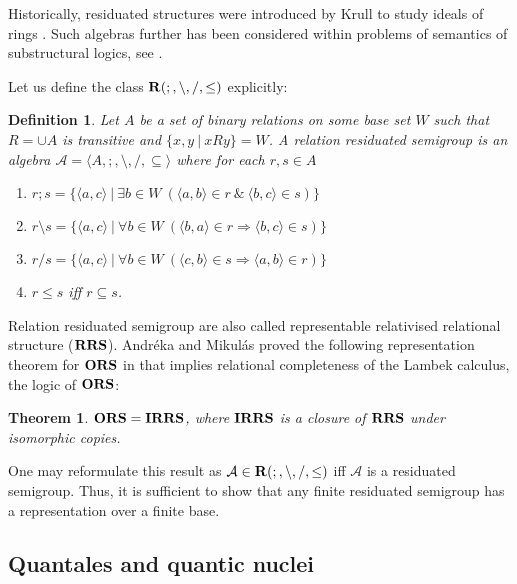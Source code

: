 \documentclass[a4paper]{article}
\theoremstyle{defin}
\newtheorem{defin}{Definition}
\theoremstyle{theorem}
\newtheorem{theorem}{Theorem}
\theoremstyle{prop}
\theoremstyle{lemma}
\theoremstyle{ex}
\theoremstyle{col}
\theoremstyle{claim}
\begin{document}
Historically, residuated structures were introduced by Krull to study ideals of rings \cite{krull1968idealtheorie}. Such algebras further has been considered within problems of semantics of substructural logics, see \cite{jipsen2002survey}.

Let us define the class ${\bf R}(;, \setminus, /, \leq)$ explicitly:

\begin{defin} \label{rrs}
  Let $A$ be a set of binary relations on some base set $W$ such that $R = \cup A$ is transitive and $\{ x, y \: | \: x R y \} = W$. A relation residuated semigroup is an algebra $\mathcal{A} = \langle A, ;, \setminus, /, \subseteq \rangle$ where for each $r, s \in A$
  \begin{enumerate}
    \item $r ; s = \{ \langle a, c \rangle \: | \: \exists b \in W \: (\langle a, b \rangle \in r \: \& \: \langle b, c \rangle \in s) \}$
    \item $r \setminus s = \{ \langle a, c \rangle \: | \: \forall b \in W \: (\langle b, a \rangle \in r \Rightarrow \langle b, c \rangle \in s)\}$
    \item $r / s = \{ \langle a, c \rangle \: | \: \forall b \in W \: (\langle c, b \rangle \in s \Rightarrow \langle a, b \rangle \in r)\}$
    \item $r \leq s$ iff $r \subseteq s$.
  \end{enumerate}
\end{defin}
Relation residuated semigroup are also called representable relativised relational structure (${\bf RRS}$).
Andr\'{e}ka and Mikul\'{a}s proved the following representation theorem for ${\bf ORS}$ in \cite{andreka1994lambek} that implies relational completeness of the Lambek calculus, the logic of ${\bf ORS}$:

\begin{theorem}\label{ors=irrs}
  ${\bf ORS} = {\bf IRRS}$, where ${\bf IRRS}$ is a closure of ${\bf RRS}$ under isomorphic copies.
\end{theorem}
One may reformulate this result as $\mathcal{A} \in {\bf R}(;, \setminus, /, \leq)$ iff $\mathcal{A}$ is a residuated semigroup. Thus, it is sufficient to show that any finite residuated semigroup has a representation over a finite base.

\subsection{Quantales and quantic nuclei}
\end{document}
